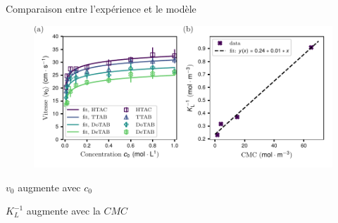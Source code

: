 \documentclass[aspectratio=169,10pt]{beamer}
\begin{document}
  
  \begin{frame}{Comparaison entre l'expérience et le modèle}
    \vspace{-.5cm}
      \begin{figure}
          \centering
          \includegraphics[scale=.7]{./figures/Vitesse_initiale_versus_concentration_modele.pdf}
      \end{figure}
      \vspace{-.5cm}
      \hspace{1.5cm}\begin{minipage}{4cm}
        \begin{ombretheo}
          \begin{theo}
            $v_0$ augmente avec $c_0$
          \end{theo}
        \end{ombretheo}
      \end{minipage}
      \hspace{3.cm}
      \begin{minipage}{5cm}
        \begin{ombretheo}
          \begin{theo}
            $K_L^{-1}$ augmente avec la $CMC$
          \end{theo}
        \end{ombretheo}
      \end{minipage}
  \end{frame}
  
\end{document}

